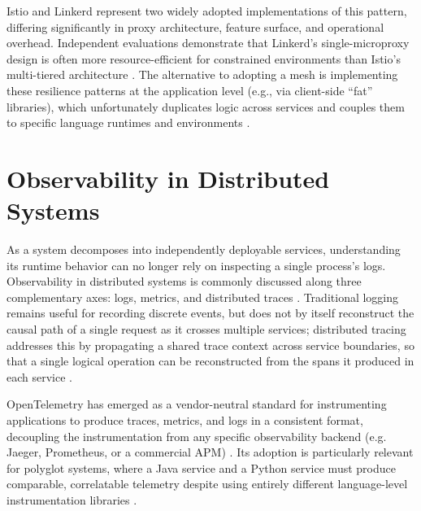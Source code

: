 \documentclass[twoside]{supsistudent}
\begin{document}
Istio and Linkerd represent two widely adopted implementations of this pattern, differing significantly in proxy architecture, feature surface, and operational overhead. Independent evaluations demonstrate that Linkerd's single-microproxy design is often more resource-efficient for constrained environments than Istio's multi-tiered architecture \cite{elkhatib2023evaluation, buoyant2026linkerd}. The alternative to adopting a mesh is implementing these resilience patterns at the application level (e.g., via client-side ``fat'' libraries), which unfortunately duplicates logic across services and couples them to specific language runtimes and environments \cite{morgan2017service, devopscon2019service}.

\section{Observability in Distributed Systems}
As a system decomposes into independently deployable services, understanding its runtime behavior can no longer rely on inspecting a single process's logs. Observability in distributed systems is commonly discussed along three complementary axes: logs, metrics, and distributed traces \cite{bourgon2017metrics, majors2018pillars}. Traditional logging remains useful for recording discrete events, but does not by itself reconstruct the causal path of a single request as it crosses multiple services; distributed tracing addresses this by propagating a shared trace context across service boundaries, so that a single logical operation can be reconstructed from the spans it produced in each service \cite{sigelman2010dapper, opentracing-spec}.

OpenTelemetry has emerged as a vendor-neutral standard for instrumenting applications to produce traces, metrics, and logs in a consistent format, decoupling the instrumentation from any specific observability backend (e.g. Jaeger, Prometheus, or a commercial APM) \cite{opentelemetry-spec}. Its adoption is particularly relevant for polyglot systems, where a Java service and a Python service must produce comparable, correlatable telemetry despite using entirely different language-level instrumentation libraries \cite{opentelemetry-spec-polyglot}.
\end{document}
